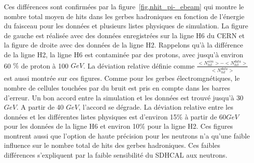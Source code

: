 Ces différences sont confirmées par la figure~\ref{fig.nhit_pi-_ebeam} qui montre le nombre total moyen de hits dans les gerbes hadroniques en fonction de l'énergie du faisceau pour les données et plusieurs listes physiques de simulation. La figure de gauche est réalisée avec des données enregistrées sur la ligne H6 du CERN et la figure de droite avec des données de la ligne H2. Rappelons qu'à la différence de la ligne H2, la ligne H6 est contaminée par des protons, avec jusqu'à environ 60 $\%$ de proton à 100 $GeV$. La déviation relative définie comme $\frac{<N_{hit}^{sim}>-<N_{hit}^{data}>}{<N_{hit}^{data}>}$ est aussi montrée sur ces figures. Comme pour les gerbes électromgnétiques, le nombre de cellules touchées par du bruit est pris en compte dans les barres d'erreur. Un bon accord entre la simulation et les données est trouvé jusqu'à 30 $GeV$. A partir de 40 $GeV$, l'accord se dégrade. La déviation relative entre les données et les différentes listes physiques est d'environ 15$\%$ à partir de 60$GeV$ pour les données de la ligne H6 et environ 10$\%$ pour la ligne H2. Ces figures montrent aussi que l'option de haute précision pour les neutrons n'a qu'une faible influence sur le nombre total de hits des gerbes hadroniques. Ces faibles différences s'expliquent par la faible sensibilité du SDHCAL aux neutrons. 
